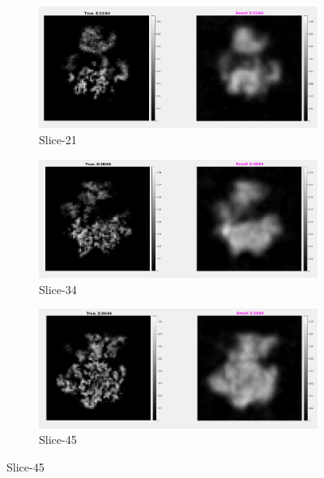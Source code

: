 \documentclass{report}
\begin{document}
\begin{figure}[H]
\centering

\begin{subfigure}{1\textwidth}
\centering
\includegraphics[width=1\linewidth]{emd_8647_result_sharp_1.png}
\captionsetup{justification=centering}
\caption{ Slice-21 }
\end{subfigure} 

\begin{subfigure}{1\textwidth}
\centering
\includegraphics[width=1\linewidth]{emd_8647_result_sharp_2.png}
\captionsetup{justification=centering}
\caption{ Slice-34 }
\end{subfigure} 

\begin{subfigure}{1\textwidth}
\centering
\includegraphics[width=1\linewidth]{emd_8647_result_sharp_3.png}
\captionsetup{justification=centering}
\caption{ Slice-45 }
\end{subfigure} 


\end{figure}
\end{document}
